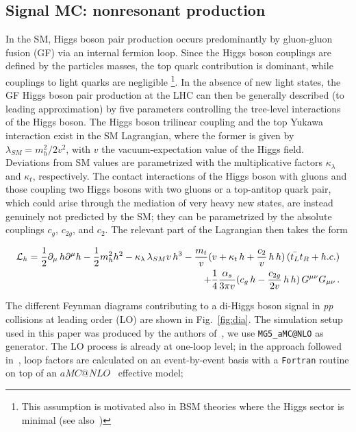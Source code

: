 \subsection{Signal MC: nonresonant production}
\label{sec:nonresMC}
In the SM, Higgs boson pair production occurs predominantly by gluon-gluon fusion (GF) via an internal fermion loop. Since the Higgs boson couplings are defined by the particles masses, the top quark contribution is dominant, while couplings to light quarks are negligible \footnote{This assumption is motivated also in BSM theories where the Higgs sector is minimal (see also~\cite{Goertz:2014qia})}. 
In the absence of new light states, the GF Higgs boson pair production at the LHC can then be generally described (to leading approximation) by five parameters controlling the tree-level interactions of the Higgs boson. 
The Higgs boson trilinear coupling and the top Yukawa interaction exist in the SM Lagrangian, where the former is given by $\lambda_{SM}=m_h^2/2v^2$, with $v$ the vacuum-expectation value of the Higgs field. Deviations from SM values are parametrized with the multiplicative factors $\kappa_{\lambda}$ and $\kappa_{t}$, respectively. The contact interactions of the Higgs boson with gluons and those coupling two Higgs bosons with two gluons or a top-antitop quark pair, which could arise through the mediation of very heavy new states, are instead genuinely not predicted by the SM; they can be parametrized by the absolute couplings $c_g$, $c_{2g}$, and $c_2$. The relevant part of the Lagrangian then takes the form \par

\begin{eqnarray}
{\cal L}_h = 
\frac{1}{2} \partial_{\mu}\, h \partial^{\mu} h - \frac{1}{2} m_h^2 h^2 -
  {\kappa_{\lambda}}\,  \lambda_{SM} v\, h^3 
- \frac{ m_t}{v}(v+   {\kappa_t} \,   h  +  \frac{c_{2}}{v}   \, h\,  h ) \,( \bar{t_L}t_R + h.c.) \nonumber  \\ 
+ \frac{1}{4} \frac{\alpha_s}{3 \pi v} (   c_g \, h -  \frac{c_{2g}}{2 v} \, h\, h ) \,  G^{\mu \nu}G_{\mu\nu}\,.
\label{eq:lag}
\end{eqnarray}

The different Feynman diagrams contributing to a di-Higgs boson signal in {\em pp} collisions at leading order (LO) are shown in Fig.~\ref{fig:dia}.
The simulation setup used in this paper was produced by the authors of~\cite{Hespel:2014sla}, we use {\tt MG5\_aMC@NLO} as generator. The LO process is already at one-loop level; in the approach followed in~\cite{Hespel:2014sla}, loop factors are calculated on an event-by-event basis with a {\tt Fortran} routine on top of an $aMC@NLO$~\cite{Frixione:2010ra, Alwall:2014hca} effective model;


